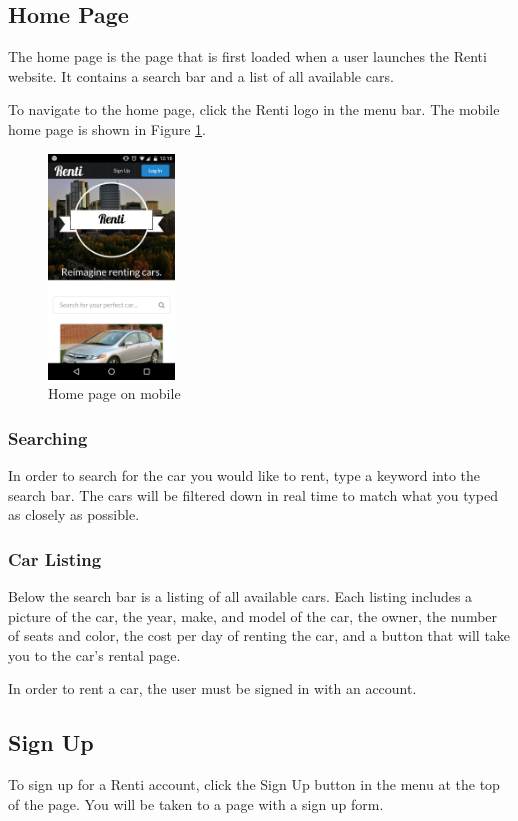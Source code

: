 \documentclass{article}
\begin{document}
\subsection{Home Page}
The home page is the page that is first loaded when a user launches the Renti website. It contains a search bar and a list of all available cars.

To navigate to the home page, click the Renti logo in the menu bar. The mobile home page is shown in Figure \ref{fig:rentiMobile}.

\begin{figure}[ht!]
    \centering
    \includegraphics[keepaspectratio, width=0.3\textwidth]{RentiMobile}
    \caption{Home page on mobile}
    \label{fig:rentiMobile}
\end{figure}

\subsubsection{Searching}
In order to search for the car you would like to rent, type a keyword into the search bar. The cars will be filtered down in real time to match what you typed as closely as possible.

\subsubsection{Car Listing}
Below the search bar is a listing of all available cars. Each listing includes a picture of the car, the year, make, and model of the car, the owner, the number of seats and color, the cost per day of renting the car, and a button that will take you to the car's rental page.

In order to rent a car, the user must be signed in with an account.

\subsection{Sign Up}
To sign up for a Renti account, click the Sign Up button in the menu at the top of the page. You will be taken to a page with a sign up form.
\end{document}
